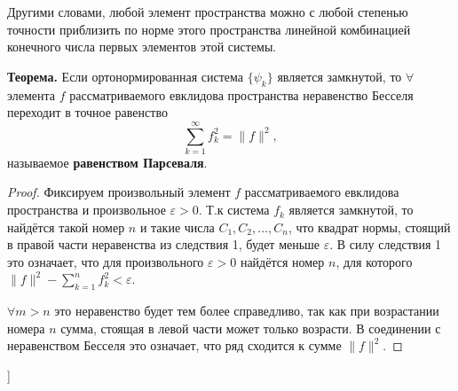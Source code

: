 Другими словами, любой элемент пространства можно с любой степенью точности приблизить по норме этого пространства линейной комбинацией конечного числа первых элементов этой системы.

\textbf{Теорема.} Если ортонормированная система $\{\psi_k\}$ является замкнутой, то $\forall$ элемента $f$ рассматриваемого евклидова пространства неравенство Бесселя переходит в точное равенство
$$\displaystyle\sum_{k=1}^{\infty}f_k^2= \| f  \|^2,$$ называемое \textbf{равенством Парсеваля}.

\begin{proof}
Фиксируем произвольный элемент $f$ рассматриваемого евклидова пространства и произвольное $\varepsilon > 0$. 
Т.к система $f_k$ является замкнутой, то найдётся такой номер $n$ и такие числа $C_1, C_2, \dots, C_n$, что квадрат нормы, стоящий в правой части неравенства из следствия 1, будет меньше $\varepsilon$. В силу следствия 1 это означает, что для произвольного $\varepsilon > 0$ найдётся номер $n$, для которого
$ \| f  \|^2- \displaystyle\sum_{k=1}^{n}f_k^2 < \varepsilon$.

$\forall m > n$ это неравенство будет тем более справедливо, так как при возрастании номера $n$ сумма, стоящая в левой части может только возрасти.
В соединении с неравенством Бесселя это означает, что ряд  сходится к сумме $ \| f \|^2$.
\end{proof}

\bigbreak
[\cite[page 69-96]{replace_me}]